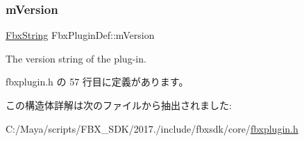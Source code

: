 \subsubsection{\texorpdfstring{m\+Version}{mVersion}}
{\footnotesize\ttfamily \hyperlink{class_fbx_string}{Fbx\+String} Fbx\+Plugin\+Def\+::m\+Version}



The version string of the plug-\/in. 



 fbxplugin.\+h の 57 行目に定義があります。



この構造体詳解は次のファイルから抽出されました\+:\begin{DoxyCompactItemize}
\item 
C\+:/\+Maya/scripts/\+F\+B\+X\+\_\+\+S\+D\+K/2017./include/fbxsdk/core/\hyperlink{fbxplugin_8h}{fbxplugin.\+h}\end{DoxyCompactItemize}
